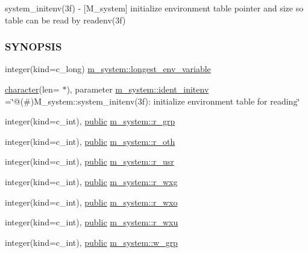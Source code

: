 \begin{DoxyCompactItemize}
\begin{DoxyCompactList}
system\+\_\+initenv(3f) -\/ \mbox{[}M\+\_\+system\mbox{]} initialize environment table pointer and size so table can be read by readenv(3f) \subsubsection*{S\+Y\+N\+O\+P\+S\+IS}\end{DoxyCompactList}\item 
integer(kind=c\+\_\+long) \hyperlink{namespacem__system_ac066b6866f8ef4b8c358ec8daca7566c}{m\+\_\+system\+::longest\+\_\+env\+\_\+variable}
\item 
\hyperlink{option__stopwatch_83_8txt_abd4b21fbbd175834027b5224bfe97e66}{character}(len= $\ast$), parameter \hyperlink{namespacem__system_a7246c40d96a190aabdd8a002c963c2d0}{m\+\_\+system\+::ident\+\_\+initenv} =\char`\"{}@(\#)M\+\_\+system\+::system\+\_\+initenv(3f)\+: initialize environment table for reading\char`\"{}
\item 
integer(kind=c\+\_\+int), \hyperlink{M__stopwatch_83_8txt_a2f74811300c361e53b430611a7d1769f}{public} \hyperlink{namespacem__system_adb853ed1f9d39c45e0b512ab39c66605}{m\+\_\+system\+::r\+\_\+grp}
\item 
integer(kind=c\+\_\+int), \hyperlink{M__stopwatch_83_8txt_a2f74811300c361e53b430611a7d1769f}{public} \hyperlink{namespacem__system_a74de84d2cb6b74e9d0d4c5aa5f1ba953}{m\+\_\+system\+::r\+\_\+oth}
\item 
integer(kind=c\+\_\+int), \hyperlink{M__stopwatch_83_8txt_a2f74811300c361e53b430611a7d1769f}{public} \hyperlink{namespacem__system_ace7825dd19ed7191b37d3a7a27c75431}{m\+\_\+system\+::r\+\_\+usr}
\item 
integer(kind=c\+\_\+int), \hyperlink{M__stopwatch_83_8txt_a2f74811300c361e53b430611a7d1769f}{public} \hyperlink{namespacem__system_a23aade9d4537c4260c2e44ef6a619db6}{m\+\_\+system\+::r\+\_\+wxg}
\item 
integer(kind=c\+\_\+int), \hyperlink{M__stopwatch_83_8txt_a2f74811300c361e53b430611a7d1769f}{public} \hyperlink{namespacem__system_a9467bf0bb7ae96061314b865bde14f57}{m\+\_\+system\+::r\+\_\+wxo}
\item 
integer(kind=c\+\_\+int), \hyperlink{M__stopwatch_83_8txt_a2f74811300c361e53b430611a7d1769f}{public} \hyperlink{namespacem__system_a10b9cc52ae68d1b64dd9f8ea4cfcd3be}{m\+\_\+system\+::r\+\_\+wxu}
\item 
integer(kind=c\+\_\+int), \hyperlink{M__stopwatch_83_8txt_a2f74811300c361e53b430611a7d1769f}{public} \hyperlink{namespacem__system_ada5683bd408b30753f7565a1bb54b339}{m\+\_\+system\+::w\+\_\+grp}

\end{DoxyCompactItemize}
